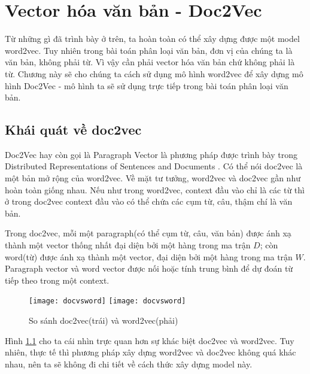 
\chapter{Vector hóa văn bản - Doc2Vec}
\ifpdf
    \graphicspath{{Doc2Vec/Chapter1Figs/PNG/}{Doc2Vec/Chapter1Figs/PDF/}{Doc2Vec/Chapter1Figs/}}
\else
    \graphicspath{{Doc2Vec/Chapter1Figs/EPS/}{Doc2Vec/Chapter1Figs/}}
\fi

Từ những gì đã trình bày ở trên, ta hoàn toàn có thể xây dựng được một model word2vec. Tuy nhiên trong bài toán phân loại văn bản, đơn vị của chúng ta là văn bản, không phải từ. Vì vậy cần phải vector hóa văn bản chứ không phải là từ. Chương này sẽ cho chúng ta cách sử dụng mô hình word2vec để xây dựng mô hình Doc2Vec - mô hình ta sẽ sử dụng trực tiếp trong bài toán phân loại văn bản. 
\section{Khái quát về doc2vec} 

Doc2Vec hay còn gọi là Paragraph Vector là phương pháp được trình bày trong Distributed Representations of Sentences and Documents \cite{DBLP:journals/corr/LeM14}. Có thể nói doc2vec là một bản mở rộng của word2vec. Về mặt tư tưởng, word2vec và doc2vec gần như hoàn toàn giống nhau. Nếu như trong word2vec, context đầu vào chỉ là các từ thì ở trong doc2vec context đầu vào có thể chứa các cụm từ, câu, thậm chí là văn bản.

Trong doc2vec, mỗi một paragraph(có thể cụm từ, câu, văn bản) được ánh xạ thành một vector thống nhất đại diện bởi một hàng trong ma trận $D$; còn word(từ) được ánh xạ thành một vector, đại diện bởi một hàng trong ma trận $W$. Paragraph vector và word vector được nối hoặc tính trung bình để dự đoán từ tiếp theo trong một context.  

\begin{figure}
  \begin{center}
    \ifpdf
      \texttt{[image: docvsword]}
    \else
      \texttt{[image: docvsword]}
    \fi
    \caption{So sánh doc2vec(trái) và word2vec(phải)}
    \label{docvsword}
  \end{center}
\end{figure}
Hình \ref{docvsword} cho ta cái nhìn trực quan hơn sự khác biệt doc2vec và word2vec. Tuy nhiên, thực tế thì phương pháp xây dựng word2vec và doc2vec không quá khác nhau, nên ta sẽ không đi chi tiết về cách thức xây dựng model này.  
